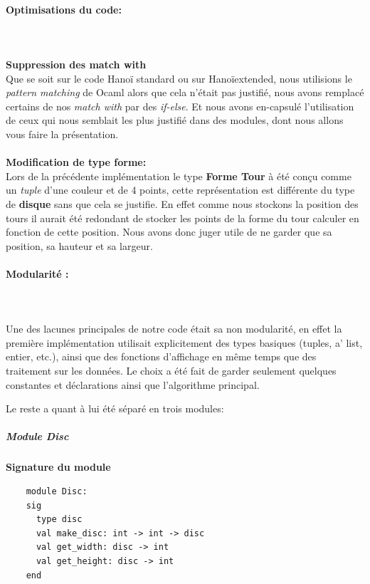\documentclass[a4paper,11pt]{article}
\begin{document}
\paragraph{Optimisations du code:} \mbox{}\\\\
\textbf{Suppression des match with}\\
Que se soit sur le code Hanoï standard ou sur Hanoïextended, nous utilisions le \textit{pattern matching} de Ocaml alors que cela n'était pas justifié, nous avons remplacé certains de nos  \textit{match with} par des \textit{if-else}.
Et nous avons en-capsulé l'utilisation de ceux qui nous semblait les plus justifié dans des modules, dont nous allons vous faire la présentation.\\\\
\textbf{Modification de type forme:}\\
Lors de la précédente implémentation le type \textbf{Forme Tour} à été conçu comme un \textit{tuple} d'une couleur et de 4 points, cette représentation est différente du type de \textbf{disque} sans que cela se justifie.
En effet comme nous stockons la position des tours il aurait été redondant de stocker les points de la forme du tour calculer en fonction de cette position.
Nous avons donc juger utile de ne garder que sa position, sa hauteur et sa largeur.

\paragraph{Modularité :}\mbox{}\\\\
Une des lacunes principales de notre code était sa non modularité, en effet la première implémentation utilisait explicitement des types basiques (tuples, a' list, entier, etc.), ainsi que des fonctions d'affichage en même temps que des traitement sur les données.
Le choix a été fait de garder seulement quelques constantes et déclarations ainsi que l'algorithme principal.

Le reste a quant à lui été séparé en trois modules:
\subparagraph{Module Disc}
\begin{center}
	\textbf{Signature du module}
	\begin{lstlisting}
	module Disc:
	sig
	  type disc
	  val make_disc: int -> int -> disc
	  val get_width: disc -> int
	  val get_height: disc -> int
	end
	\end{lstlisting}
\end{center}
\end{document}
